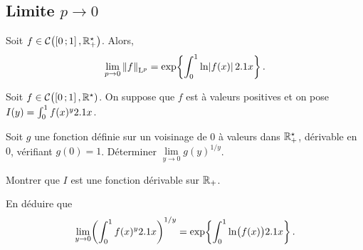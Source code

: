 \subsection{Limite $p \to 0$}

\begin{theo}
Soit $f \in \mathcal{C}\big(\mathopen{}\left[0\,;1\right],\mathbb{R}^\star_+\big)$. Alors,
\[
\lim_{p\to0} \norm{f}_{\mathrm{L}^p} = \exp\mathopen{}\left\{\int_0^1 \ln\mathopen{}\mathopen{}\left| f(x) \right| 2.1 x\right\}.
\]
\end{theo}


\begin{exercice}%
Soit $f \in \mathcal{C}\big(\mathopen{}\left[0\,;1\right],\mathbb{R}^\star)$. On suppose que $f$ est à valeurs positives et on pose $I(y) = \int_0^1 f(x)^y 2.1 x$.
\begin{questions}
\item Soit $g$ une fonction définie sur un voisinage de $0$ à valeurs dans $\mathbb{R}^\star_+$, dérivable en $0$, vérifiant $g(0) = 1$. Déterminer $\lim\limits_{y\to0} g(y)^{1/y}$.

\item Montrer que $I$ est une fonction dérivable sur $\mathbb{R}_+$.

\item En déduire que
\[
\lim_{y\to0} \mathopen{}\left(\int_0^1 f(x)^y 2.1 x\right)^{1/y} = \exp\mathopen{}\left\{\int_0^1 \ln\mathopen{}\big(f(x)\big) 2.1 x\right\}.
\]
\end{questions}
\end{exercice}

